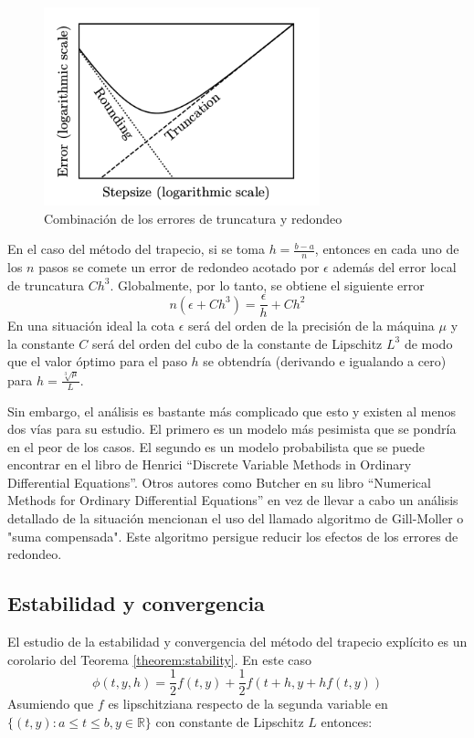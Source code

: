 \documentclass{article}
\theoremstyle{theorem-style}  %
\theoremstyle{definition-style}
\theoremstyle{example-style}
\begin{document}
		\begin{figure}[H]
			\centering
			\includegraphics[width=8cm]{./Images/redondeo.png}
			\caption{Combinación de los errores de truncatura y redondeo}
			\label{fig:redondeo}
		\end{figure}

		En el caso del método del trapecio, si se toma $h=\frac{b-a}{n}$, entonces en cada uno de los $n$ pasos se comete un error de redondeo acotado por $\epsilon$ además del error local de truncatura $Ch^{3}$. Globalmente, por lo tanto, se obtiene el siguiente error
		$$ n(\epsilon+Ch^{3})=\frac{\epsilon}{h}+Ch^{2} $$
		En una situación ideal la cota $\epsilon$ será del orden de la precisión de la máquina $\mu$ y la constante $C$ será del orden del cubo de la constante de Lipschitz $L^3$ de modo que el valor óptimo para el paso $h$ se obtendría (derivando e igualando a cero) para $h=\frac{\sqrt[3]\mu}{L}$.

		Sin embargo, el análisis es bastante más complicado que esto y existen al menos dos vías para su estudio. El primero es un modelo más pesimista que se pondría en el peor de los casos. El segundo es un modelo probabilista que se puede encontrar en el libro de Henrici ``Discrete Variable Methods in Ordinary Differential Equations''. Otros autores como Butcher en su libro ``Numerical Methods for Ordinary Differential Equations'' en vez de llevar a cabo un análisis detallado de la situación mencionan el uso del llamado algoritmo de Gill-Moller o "suma compensada". Este algoritmo persigue reducir los efectos de los errores de redondeo.\cite{Butcher}

\subsection{Estabilidad y convergencia} \label{sec:trapecio-explicito:estabilidad}

	El estudio de la estabilidad y convergencia del método del trapecio explícito es un corolario del Teorema \ref{theorem:stability}. En este caso
	$$\phi(t,y,h)=\frac{1}{2}f(t,y)+\frac{1}{2}f(t+h,y+hf(t,y))$$
	Asumiendo que $f$ es lipschitziana respecto de la segunda variable en  $\{(t,y):a \leq t \leq b, y \in \mathbb{R}\}$ con constante de Lipschitz $L$ entonces:
\end{document}
